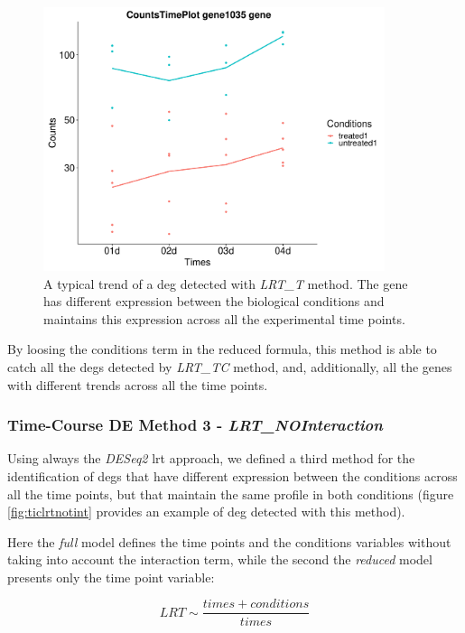 \begin{figure}[H]
\centering
\includegraphics[width=10cm, keepaspectratio]{img/ticorser/de/trends/trend_t.pdf}
\caption[\gls{tic} LRT\_T trend]{A typical trend of a \gls{deg} detected with \textit{LRT\_T} method.
The gene has different expression between the biological conditions and maintains this expression across all the experimental time points.}
\label{fig:ticlrtt}
\end{figure}

By loosing the conditions term in the reduced formula, this method is able to catch all the \glspl{deg} detected by \textit{LRT\_TC} method, and, additionally, all the genes with different trends across all the time points.

\subsubsection{Time-Course DE Method 3 - \textit{LRT\_NOInteraction}}
Using always the \textit{DESeq2} \gls{lrt} approach, we defined a third method for the 
identification of \glspl{deg} that have different expression between the conditions across all the time points, but that maintain the same profile in both conditions (figure \ref{fig:ticlrtnotint} provides an example of \gls{deg} detected with this method).

Here the \textit{full} model defines the time points and the conditions variables without taking into account the interaction term, while the second the \textit{reduced} model presents only the time point variable:

\[LRT \sim \frac{times+conditions}{times}\]

